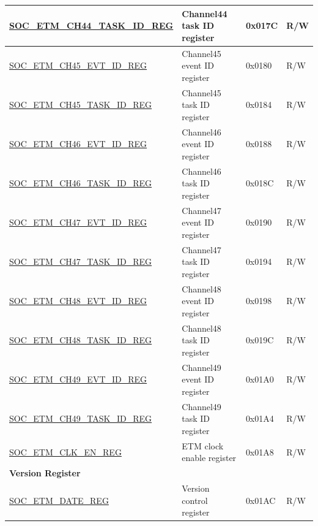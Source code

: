 \begin{longtable}{ | p{6cm} | p{6.4cm} | p{1.3cm} | p{1.8cm} | }
\hyperref[regdesc:SOCETMCH0TASKIDREG]{SOC\_ETM\_CH44\_TASK\_ID\_REG} & Channel44 task ID register & 0x017C & R/W \\ \hline
\hyperref[regdesc:SOCETMCH0EVTIDREG]{SOC\_ETM\_CH45\_EVT\_ID\_REG} & Channel45 event ID register & 0x0180 & R/W \\ \hline
\hyperref[regdesc:SOCETMCH0TASKIDREG]{SOC\_ETM\_CH45\_TASK\_ID\_REG} & Channel45 task ID register & 0x0184 & R/W \\ \hline
\hyperref[regdesc:SOCETMCH0EVTIDREG]{SOC\_ETM\_CH46\_EVT\_ID\_REG} & Channel46 event ID register & 0x0188 & R/W \\ \hline
\hyperref[regdesc:SOCETMCH0TASKIDREG]{SOC\_ETM\_CH46\_TASK\_ID\_REG} & Channel46 task ID register & 0x018C & R/W \\ \hline
\hyperref[regdesc:SOCETMCH0EVTIDREG]{SOC\_ETM\_CH47\_EVT\_ID\_REG} & Channel47 event ID register & 0x0190 & R/W \\ \hline
\hyperref[regdesc:SOCETMCH0TASKIDREG]{SOC\_ETM\_CH47\_TASK\_ID\_REG} & Channel47 task ID register & 0x0194 & R/W \\ \hline
\hyperref[regdesc:SOCETMCH0EVTIDREG]{SOC\_ETM\_CH48\_EVT\_ID\_REG} & Channel48 event ID register & 0x0198 & R/W \\ \hline
\hyperref[regdesc:SOCETMCH0TASKIDREG]{SOC\_ETM\_CH48\_TASK\_ID\_REG} & Channel48 task ID register & 0x019C & R/W \\ \hline
\hyperref[regdesc:SOCETMCH0EVTIDREG]{SOC\_ETM\_CH49\_EVT\_ID\_REG} & Channel49 event ID register & 0x01A0 & R/W \\ \hline
\hyperref[regdesc:SOCETMCH0TASKIDREG]{SOC\_ETM\_CH49\_TASK\_ID\_REG} & Channel49 task ID register & 0x01A4 & R/W \\ \hline
\hyperref[regdesc:SOCETMCLKENREG]{SOC\_ETM\_CLK\_EN\_REG} & ETM clock enable register & 0x01A8 & R/W \\ \hline
\multicolumn{4}{|l|}{\textbf{Version Register}} \\ \hline
\hyperref[regdesc:SOCETMDATEREG]{SOC\_ETM\_DATE\_REG} & Version control register & 0x01AC & R/W \\ \hline
\end{longtable}
